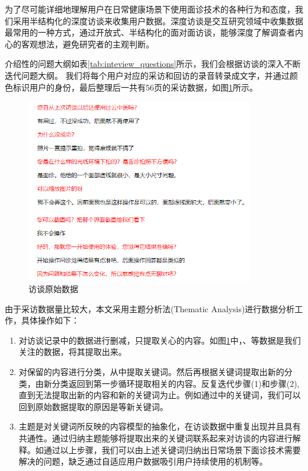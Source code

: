 为了尽可能详细地理解用户在日常健康场景下使用面诊技术的各种行为和态度，我们采用半结构化的深度访谈来收集用户数据\cite{DiciccoThe}。深度访谈是交互研究领域中收集数据最常用的一种方式，通过开放式、半结构化的面对面访谈，能够深度了解调查者内心的客观想法，避免研究者的主观判断。

介绍性的问题大纲如表\ref{tab:inteview_questions}所示，我们会根据访谈的深入不断迭代问题大纲。
我们将每个用户对应的采访和回访的录音转录成文字，并通过颜色标识用户的身份，最后整理后一共有56页的采访数据，如图\ref{fig:datas}所示。

\begin{figure}[h]
    \centering
    \includegraphics[height=8cm]{images/datas.png}
    \caption{访谈原始数据}
    \label{fig:datas}
\end{figure}

由于采访数据量比较大，本文采用主题分析法(Thematic Analysis)进行数据分析工作，具体操作如下\cite{SchwandtQualitative}：



\begin{enumerate}

    \item 对访谈记录中的数据进行删减，只提取关心的内容。如图\ref{fig:datas}中，、等数据是我们关注的数据，将其提取出来。

    \item 对保留的内容进行分类，从中提取关键词。然后再根据关键词提取出新的分类，由新分类返回到第一步循环提取相关的内容。反复迭代步骤(1)和步骤(2), 直到无法提取出新的内容和新的关键词为止。例如通过中的关键词，我们可以回到原始数据提取的原因是等新关键词。

    \item 主题是对关键词所反映的内容模型的抽象化，在访谈数据中重复出现并且具有共通性。通过归纳主题能够将提取出来的关键词联系起来对访谈的内容进行解释。如通过以上步骤，我们可以由上述关键词归纳出日常场景下面诊技术需要解决的问题，缺乏通过自适应用户数据吸引用户持续使用的机制等。
\end{enumerate}

